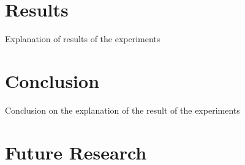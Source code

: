 \documentclass{ba-kecs}
\begin{document}
\section{Results}
Explanation of results of the experiments
\section{Conclusion}
Conclusion on the explanation of the result of the experiments
\section{Future Research}

\end{document}
